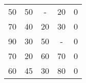\begin{tabular}{ccccc}
50     & 50     & -      & 20     & 0 \\
70     & 40     & 20     & 30     & 0 \\
90     & 30     & 50     & -      & 0 \\
70     & 20     & 60     & 70     & 0 \\
60     & 45     & 30     & 80     & 0 \bigstrut[b]\\
\hline
\hline
\end{tabular}%
